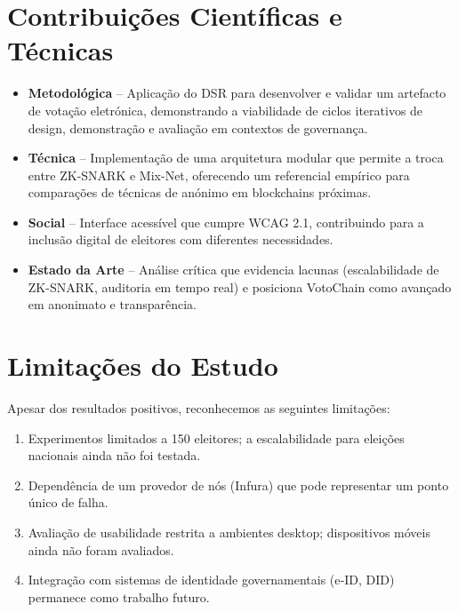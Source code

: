 \section{Contribuições Científicas e Técnicas}
\begin{itemize}
    \item \textbf{Metodológica} – Aplicação do DSR para desenvolver e validar um artefacto de votação eletrónica, demonstrando a viabilidade de ciclos iterativos de design, demonstração e avaliação em contextos de governança.
    \item \textbf{T{\'e}cnica} – Implementa{\c{c}}{\~a}o de uma arquitetura modular que permite a troca entre ZK-SNARK e Mix-Net, oferecendo um referencial emp{\'i}rico para compara{\c{c}}{\~o}es de t{\'e}cnicas de an{\'o}nimo em blockchains pr{\'o}ximas.
    \item \textbf{Social} – Interface acessível que cumpre WCAG 2.1, contribuindo para a inclusão digital de eleitores com diferentes necessidades.
    \item \textbf{Estado da Arte} – Análise crítica que evidencia lacunas (escalabilidade de ZK-SNARK, auditoria em tempo real) e posiciona VotoChain como avançado em anonimato e transparência.
\end{itemize}

\section{Limitações do Estudo}
Apesar dos resultados positivos, reconhecemos as seguintes limitações:
\begin{enumerate}
    \item Experimentos limitados a 150 eleitores; a escalabilidade para eleições nacionais ainda não foi testada.
    \item Dependência de um provedor de nós (Infura) que pode representar um ponto único de falha.
    \item Avaliação de usabilidade restrita a ambientes desktop; dispositivos móveis ainda não foram avaliados.
    \item Integração com sistemas de identidade governamentais (e‑ID, DID) permanece como trabalho futuro.
\end{enumerate}

